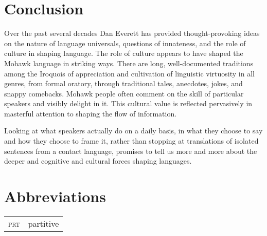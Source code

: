 \documentclass[output=paper,colorlinks,citecolor=brown]{langscibook}
\begin{document}
\section{Conclusion}

Over the past several decades Dan Everett has provided thought-provoking ideas on the nature of language universals, questions of innateness, and the role of culture in shaping language. The role of culture appears to have shaped the Mohawk language in striking ways. There are long, well-documented traditions among the Iroquois of appreciation and cultivation of linguistic virtuosity in all genres, from formal oratory, through traditional tales, anecdotes, jokes, and snappy comebacks. Mohawk people often comment on the skill of particular speakers and visibly delight in it. This cultural value is reflected pervasively in masterful attention to shaping the flow of information.

Looking at what speakers actually do on a daily basis, in what they choose to say and how they choose to frame it, rather than stopping at translations of isolated sentences from a contact language, promises to tell us more and more about the deeper and cognitive and cultural forces shaping languages.

\section*{Abbreviations}
\begin{tabularx}{.5\textwidth}{lQ}
\textsc{prt} & partitive \\
\end{tabularx}

\printbibliography[heading=subbibliography,notkeyword=this]
\end{document}

